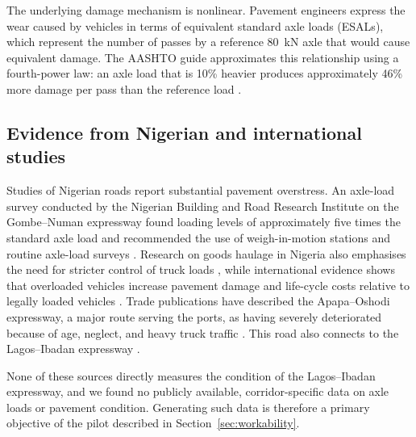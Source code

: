 \documentclass[11pt,a4paper]{article}
\begin{document}
The underlying damage mechanism is nonlinear. Pavement engineers express the wear caused by vehicles in terms of equivalent standard axle loads (ESALs), which represent the number of passes by a reference 80~kN axle that would cause equivalent damage. The AASHTO guide approximates this relationship using a fourth-power law: an axle load that is 10\% heavier produces approximately 46\% more damage per pass than the reference load \cite{aashto}.

\subsection{Evidence from Nigerian and international studies}
Studies of Nigerian roads report substantial pavement overstress. An axle-load survey conducted by the Nigerian Building and Road Research Institute on the Gombe--Numan expressway found loading levels of approximately five times the standard axle load and recommended the use of weigh-in-motion stations and routine axle-load surveys \cite{nbrri}. Research on goods haulage in Nigeria also emphasises the need for stricter control of truck loads \cite{oguntayo}, while international evidence shows that overloaded vehicles increase pavement damage and life-cycle costs relative to legally loaded vehicles \cite{pais}. Trade publications have described the Apapa--Oshodi expressway, a major route serving the ports, as having severely deteriorated because of age, neglect, and heavy truck traffic \cite{shippingposition}. This road also connects to the Lagos--Ibadan expressway \cite{businessday}.

None of these sources directly measures the condition of the Lagos--Ibadan expressway, and we found no publicly available, corridor-specific data on axle loads or pavement condition. Generating such data is therefore a primary objective of the pilot described in Section~\ref{sec:workability}.
\end{document}

